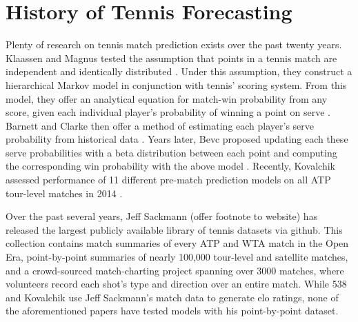 \documentclass[chapterprefix=false]{report}
\begin{document}



\section{History of Tennis Forecasting}
Plenty of research on tennis match prediction exists over the past twenty years. Klaassen and Magnus tested the assumption that points in a tennis match are independent and identically distributed \cite{KlaassenandMagnus2001}. Under this assumption, they construct a hierarchical Markov model in conjunction with tennis' scoring system. From this model, they offer an analytical equation for match-win probability from any score, given each individual player's probability of winning a point on serve \cite{Klaassen2003}.  Barnett and Clarke then offer a method of estimating each player's serve probability from historical data \cite{BarnettandClarke2005}. Years later, Bevc proposed updating each these serve probabilities with a beta distribution between each point and computing the corresponding win probability with the above model \cite{Bevc2015}. Recently, Kovalchik assessed performance of 11 different pre-match prediction models on all ATP tour-level matches in 2014 \cite{Kovalchik2016}.

Over the past several years, Jeff Sackmann (offer footnote to website) has released the largest publicly available library of tennis datasets via github. This collection contains match summaries of every ATP and WTA match in the Open Era, point-by-point summaries of nearly 100,000 tour-level and satellite matches, and a crowd-sourced match-charting project spanning over 3000 matches, where volunteers record each shot’s type and direction over an entire match. While 538 and Kovalchik use Jeff Sackmann’s match data to generate elo ratings, none of the aforementioned papers have tested models with his point-by-point dataset.
\end{document}
